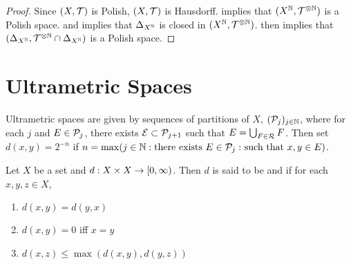 \documentclass{book}
\begin{document}
\begin{proof}
	Since $(X, \mathcal{T})$ is Polish, $(X, \mathcal{T})$ is Hausdorff.  implies that $(X^{\mathbb{N}}, \mathcal{T}^{\otimes \mathbb{N}})$ is a Polish space. and  implies that $\Delta_{X^{\mathbb{N}}}$ is closed in $(X^{\mathbb{N}}, \mathcal{T}^{\otimes \mathbb{N}})$.  then implies that $(\Delta_{X^{\mathbb{N}}}, \mathcal{T}^{\otimes \mathbb{N}} \cap \Delta_{X^{\mathbb{N}}})$ is a Polish space. 
\end{proof}


















































\newpage
\section{Ultrametric Spaces}

Ultrametric spaces are given by sequences of partitions of $X$, $(\mathcal{P}_j)_{j \in \mathbb{N}}$, where for each $j$ and $E \in \mathcal{P}_j$, there exists $\mathcal{E} \subset \mathcal{P}_{j+1}$ such that $E = \bigcup_{F \in \mathcal{R}} F$. Then set $d(x, y) = 2^{-n}$ if $n = \max(j \in \mathbb{N}: \text{there exists $E \in \mathcal{P}_j:$ such that $x,y \in E$})$.

\begin{defn}
	Let $X$ be a set and $d:X \times X \rightarrow [0,\infty)$. Then $d$ is said to be and  if for each $x, y, z \in X$,
	\begin{enumerate}
		\item {} $d(x,y) = d(y,x)$
		\item {} $d(x,y) = 0$ iff $x= y$
		\item {} $d(x,z) \leq \max(d(x,y), d(y,z))$ 
	\end{enumerate} 
\end{defn}
\end{document}
